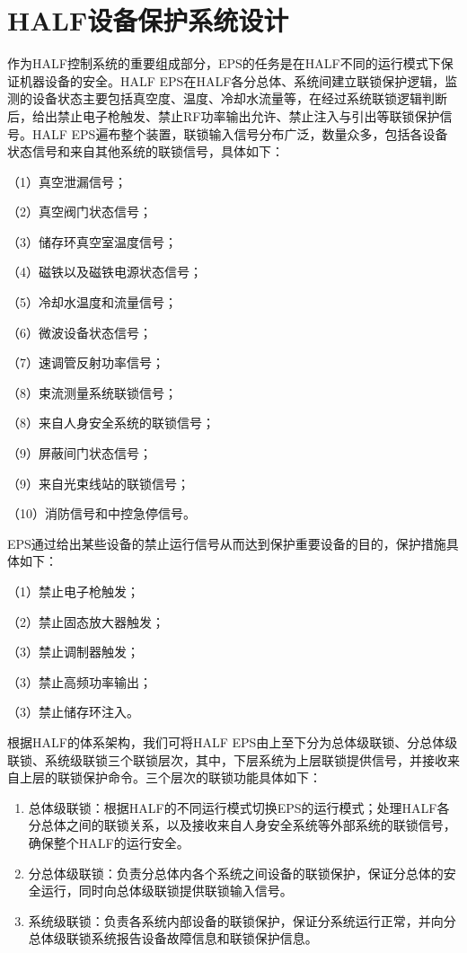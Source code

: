 \section{HALF设备保护系统设计}

作为HALF控制系统的重要组成部分，EPS的任务是在HALF不同的运行模式下保证机器设备的安全。HALF EPS在HALF各分总体、系统间建立联锁保护逻辑，监测的设备状态主要包括真空度、温度、冷却水流量等，在经过系统联锁逻辑判断后，给出禁止电子枪触发、禁止RF功率输出允许、禁止注入与引出等联锁保护信号。HALF EPS遍布整个装置，联锁输入信号分布广泛，数量众多，包括各设备状态信号和来自其他系统的联锁信号，具体如下：

（1）真空泄漏信号；

（2）真空阀门状态信号；

（3）储存环真空室温度信号；

（4）磁铁以及磁铁电源状态信号；

（5）冷却水温度和流量信号；

（6）微波设备状态信号；

（7）速调管反射功率信号；

（8）束流测量系统联锁信号；

（8）来自人身安全系统的联锁信号；

（9）屏蔽间门状态信号；

（9）来自光束线站的联锁信号；

（10）消防信号和中控急停信号。

EPS通过给出某些设备的禁止运行信号从而达到保护重要设备的目的，保护措施具体如下：

（1）禁止电子枪触发；

（2）禁止固态放大器触发；

（3）禁止调制器触发；

（3）禁止高频功率输出；

（3）禁止储存环注入。

根据HALF的体系架构，我们可将HALF EPS由上至下分为总体级联锁、分总体级联锁、系统级联锁三个联锁层次，其中，下层系统为上层联锁提供信号，并接收来自上层的联锁保护命令。三个层次的联锁功能具体如下：

\begin{enumerate}
  \item 总体级联锁：根据HALF的不同运行模式切换EPS的运行模式；处理HALF各分总体之间的联锁关系，以及接收来自人身安全系统等外部系统的联锁信号，确保整个HALF的运行安全。

  \item 分总体级联锁：负责分总体内各个系统之间设备的联锁保护，保证分总体的安全运行，同时向总体级联锁提供联锁输入信号。

  \item 系统级联锁：负责各系统内部设备的联锁保护，保证分系统运行正常，并向分总体级联锁系统报告设备故障信息和联锁保护信息。

\end{enumerate}

